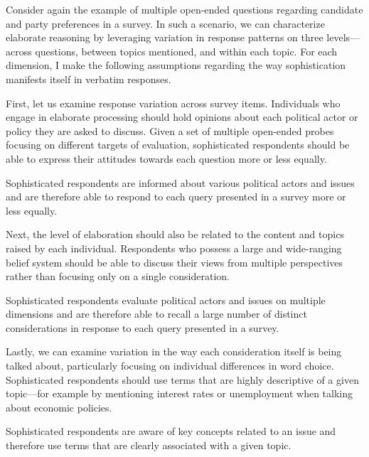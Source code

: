 Consider again the example of multiple open-ended questions regarding candidate and party preferences in a survey. In such a scenario, we can characterize elaborate reasoning by leveraging variation in response patterns on three levels---across questions, between topics mentioned, and within each topic. For each dimension, I make the following assumptions regarding the way sophistication manifests itself in verbatim responses.

First, let us examine response variation across survey items. Individuals who engage in elaborate processing should hold opinions about each political actor or policy they are asked to discuss. Given a set of multiple open-ended probes focusing on different targets of evaluation, sophisticated respondents should be able to express their attitudes towards each question more or less equally.%

\begin{assumption}[Opinionation]
Sophisticated respondents are informed about various political actors and issues and are therefore able to respond to each query presented in a survey more or less equally.
\end{assumption}

Next, the level of elaboration should also be related to the content and topics raised by each individual. Respondents who possess a large and wide-ranging belief system should be able to discuss their views from multiple perspectives rather than focusing only on a single consideration.

\begin{assumption}[Considerations]
Sophisticated respondents evaluate political actors and issues on multiple dimensions and are therefore able to recall a large number of distinct considerations in response to each query presented in a survey. 
\end{assumption}

Lastly, we can examine variation in the way each consideration itself is being talked about, particularly focusing on individual differences in word choice. Sophisticated respondents should use terms that are highly descriptive of a given topic---for example by mentioning interest rates or unemployment when talking about economic policies.

\begin{assumption}
Sophisticated respondents are aware of key concepts related to an issue and therefore use terms that are clearly associated with a given topic.
\end{assumption}

